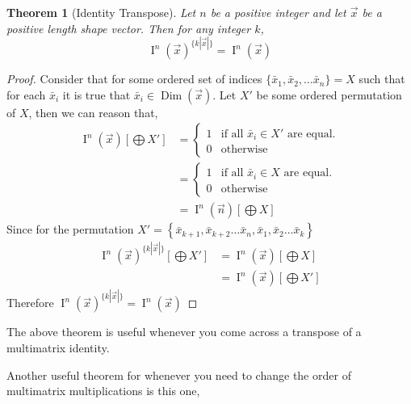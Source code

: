 \documentclass[12pt]{book}
\theoremstyle{plain}
\newtheorem{theorem}{Theorem}[chapter]
\theoremstyle{definition}
\theoremstyle{ppart}
\theoremstyle{case}
\theoremstyle{solution}
\DeclareMathOperator{\Dim}{Dim}
\DeclareMathOperator{\Ident}{I}
\DeclareMathOperator{\Tran}{Tran}
\newcommand{\shape}[1]{\left|#1\right|}
\newcommand{\transpose}[2]{{#1}^{\{#2\}}}
\begin{document}
\begin{theorem}[Identity Transpose]
Let $n$ be a positive integer and let $\vec{x}$ be a positive length
shape vector. Then for any integer $k$,
\[ \transpose{\Ident^n(\vec{x})}{k\shape{\vec{x}}} = \Ident^n(\vec{x}) \]
\end{theorem}
\begin{proof}
Consider that for some ordered set of indices
$\{\bar{x}_1, \bar{x}_2, \ldots \bar{x}_n\} = X$ such that for each
$\bar{x}_i$ it is true that $\bar{x}_i \in \Dim(\vec{x})$.
Let $X'$ be some ordered permutation of $X$, then we can reason that,
\begin{align*}
 \Ident^n(\vec{x})\left[\bigoplus X'\right]
 &= 
	\left\{
  \begin{array}{ll}
    1 & \mbox{if all } \bar{x}_i \in X' \mbox{ are equal.}\\
    0 & \mbox{otherwise}
  \end{array}
	\right.\\
 &= 
	\left\{
  \begin{array}{ll}
    1 & \mbox{if all } \bar{x}_i \in X \mbox{ are equal.}\\
    0 & \mbox{otherwise}
  \end{array}
	\right.\\
 &=\Ident^n(\vec{n})\left[\bigoplus X\right]
\end{align*}
Since for the permutation
$X' = \left\{\bar{x}_{k+1}, \bar{x}_{k+2} \ldots \bar{x}_{n},
\bar{x}_1, \bar{x}_2 \ldots \bar{x}_k\right\}$
\begin{align*}
  \transpose{\Ident^n(\vec{x})}{k\shape{\vec{x}}}\left[\bigoplus X'\right]
	&=
  \Ident^n(\vec{x})\left[\bigoplus X\right]\\
	&=
  \Ident^n(\vec{x})\left[\bigoplus X'\right]
\end{align*}
Therefore
$\transpose{\Ident^n(\vec{x})}{k\shape{\vec{x}}} = \Ident^n(\vec{x})$
\end{proof}

The above theorem is useful whenever you come across a transpose of a
multimatrix identity.

Another useful theorem for whenever you need to change the order of
multimatrix multiplications is this one,
\end{document}
